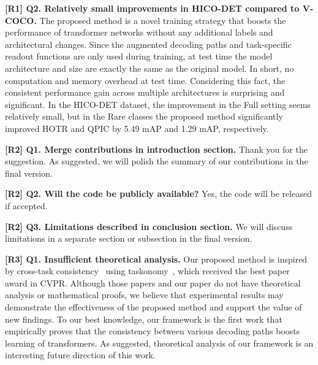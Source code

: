 \documentclass[10pt,twocolumn,letterpaper]{article}
\newcommand{\hjk}[1]{{\color{black}#1}}
\begin{document}
\hjk{\noindent\textbf{[R1] Q2. Relatively small improvements in HICO-DET compared to V-COCO.}\newline
The proposed method is a novel training strategy that boosts the performance of transformer networks without any additional labels and architectural changes.
Since the augmented decoding paths and task-specific readout functions are only used during training, at test time the model architecture and size are exactly the same as the original model. In short, no computation and memory overhead at test time.  
Considering this fact, the consistent performance gain across multiple architectures is surprising and significant. 
In the HICO-DET dataset, the improvement in the Full setting seems relatively small, but in the Rare classes the proposed method significantly improved HOTR and QPIC by 5.49 mAP and 1.29 mAP, respectively.}






\hjk{
\noindent\textbf{[R2] Q1. Merge contributions in introduction section.}\newline
Thank you for the suggestion. As suggested, we will polish the summary of our contributions in the final version.

\noindent\textbf{[R2] Q2. Will the code be publicly  available?}\newline
Yes, the code will be released if accepted.



\noindent\textbf{[R2] Q3. Limitations described in conclusion section.}\newline
We will discuss limitations in a separate section or subsection in the final version.

\noindent\textbf{[R3] Q1. Insufficient theoretical analysis.}\newline
Our proposed method is inspired by cross-task consistency~\cite{zamir2020robust} using taskonomy~\cite{zamir2018taskonomy}, which received the best paper award in CVPR.
Although those papers and our paper do not have theoretical analysis or mathematical proofs, we believe that experimental results may demonstrate the effectiveness of the proposed method and support the value of new findings. 
To our best knowledge, our framework is the first work that empirically proves that the consistency between various decoding paths boosts learning of transformers.
As suggested, theoretical analysis of our framework is an interesting future direction of this work.}
\end{document}
